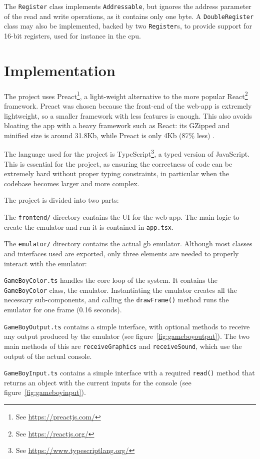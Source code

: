 \documentclass[11pt]{informatics-report}
\newcommand{\ftnt}[1]{\footnote{See \url{#1}}}
\begin{document}
The \texttt{Register} class implements \texttt{Addressable}, but ignores the address parameter of the read and write operations, as it contains only one byte. A \texttt{DoubleRegister} class may also be implemented, backed by two \texttt{Register}s, to provide support for 16-bit registers, used for instance in the \gls{cpu}.

\chapter{Implementation}

The project uses Preact\ftnt{https://preactjs.com/}, a light-weight alternative to the more popular React\ftnt{https://reactjs.org/} framework. Preact was chosen because the front-end of the web-app is extremely lightweight, so a smaller framework with less features is enough. This also avoids bloating the app with a heavy framework such as React: its GZipped and minified size is around 31.8Kb, while Preact is only 4Kb (87\% less) \cite{preact_vs_react_size}.

The language used for the project is TypeScript\ftnt{https://www.typescriptlang.org/}, a typed version of JavaScript. This is essential for the project, as ensuring the correctness of code can be extremely hard without proper typing constraints, in particular when the codebase becomes larger and more complex.

The project is divided into two parts:
\begin{compactitem}
    \item The \texttt{frontend/} directory contains the UI for the web-app. The main logic to create the emulator and run it is contained in \texttt{app.tsx}.
    \item  The \texttt{emulator/} directory contains the actual \gls{gb} emulator. Although most classes and interfaces used are exported, only three elements are needed to properly interact with the emulator:
    \begin{compactitem}
        \item \texttt{GameBoyColor.ts} handles the core loop of the system. It contains the \texttt{GameBoyColor} class, the emulator. Instantiating the emulator creates all the necessary sub-components, and calling the \texttt{drawFrame()} method runs the emulator for one frame (0.16 seconds).
        \item \texttt{GameBoyOutput.ts} contains a simple interface, with optional methods to receive any output produced by the emulator (see figure~\ref{fig:gameboyoutput}). The two main methods of this are \texttt{receiveGraphics} and \texttt{receiveSound}, which use the output of the actual console.
        \item \texttt{GameBoyInput.ts} contains a simple interface with a required \texttt{read()} method that returns an object with the current inputs for the console (see figure~\ref{fig:gameboyinput}).
    \end{compactitem}
\end{compactitem}
\end{document}
